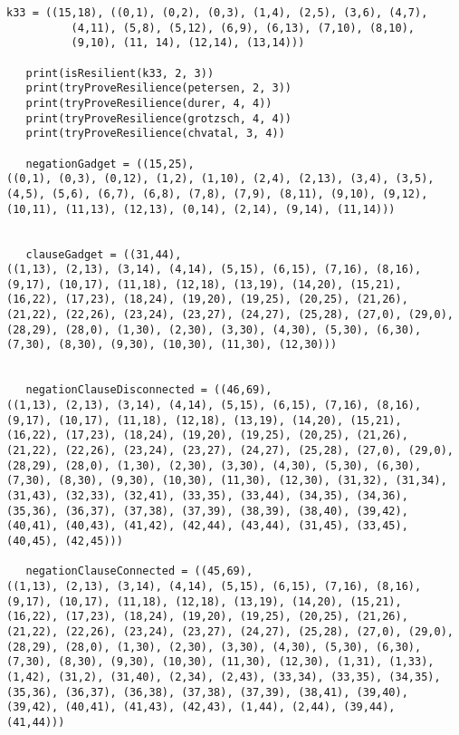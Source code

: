 \begin{lstlisting}[caption={The sourcecode for computing resilience by brute
force and heuristically-guided search.},label=listing:resilience]
   k33 = ((15,18), ((0,1), (0,2), (0,3), (1,4), (2,5), (3,6), (4,7),
          (4,11), (5,8), (5,12), (6,9), (6,13), (7,10), (8,10),
          (9,10), (11, 14), (12,14), (13,14)))

   print(isResilient(k33, 2, 3))
   print(tryProveResilience(petersen, 2, 3))
   print(tryProveResilience(durer, 4, 4))
   print(tryProveResilience(grotzsch, 4, 4))
   print(tryProveResilience(chvatal, 3, 4))

   negationGadget = ((15,25),
((0,1), (0,3), (0,12), (1,2), (1,10), (2,4), (2,13), (3,4), (3,5),
(4,5), (5,6), (6,7), (6,8), (7,8), (7,9), (8,11), (9,10), (9,12),
(10,11), (11,13), (12,13), (0,14), (2,14), (9,14), (11,14)))


   clauseGadget = ((31,44),
((1,13), (2,13), (3,14), (4,14), (5,15), (6,15), (7,16), (8,16),
(9,17), (10,17), (11,18), (12,18), (13,19), (14,20), (15,21),
(16,22), (17,23), (18,24), (19,20), (19,25), (20,25), (21,26),
(21,22), (22,26), (23,24), (23,27), (24,27), (25,28), (27,0), (29,0),
(28,29), (28,0), (1,30), (2,30), (3,30), (4,30), (5,30), (6,30),
(7,30), (8,30), (9,30), (10,30), (11,30), (12,30)))


   negationClauseDisconnected = ((46,69),
((1,13), (2,13), (3,14), (4,14), (5,15), (6,15), (7,16), (8,16),
(9,17), (10,17), (11,18), (12,18), (13,19), (14,20), (15,21),
(16,22), (17,23), (18,24), (19,20), (19,25), (20,25), (21,26),
(21,22), (22,26), (23,24), (23,27), (24,27), (25,28), (27,0), (29,0),
(28,29), (28,0), (1,30), (2,30), (3,30), (4,30), (5,30), (6,30),
(7,30), (8,30), (9,30), (10,30), (11,30), (12,30), (31,32), (31,34),
(31,43), (32,33), (32,41), (33,35), (33,44), (34,35), (34,36),
(35,36), (36,37), (37,38), (37,39), (38,39), (38,40), (39,42),
(40,41), (40,43), (41,42), (42,44), (43,44), (31,45), (33,45),
(40,45), (42,45)))

   negationClauseConnected = ((45,69), 
((1,13), (2,13), (3,14), (4,14), (5,15), (6,15), (7,16), (8,16),
(9,17), (10,17), (11,18), (12,18), (13,19), (14,20), (15,21),
(16,22), (17,23), (18,24), (19,20), (19,25), (20,25), (21,26),
(21,22), (22,26), (23,24), (23,27), (24,27), (25,28), (27,0), (29,0),
(28,29), (28,0), (1,30), (2,30), (3,30), (4,30), (5,30), (6,30),
(7,30), (8,30), (9,30), (10,30), (11,30), (12,30), (1,31), (1,33),
(1,42), (31,2), (31,40), (2,34), (2,43), (33,34), (33,35), (34,35),
(35,36), (36,37), (36,38), (37,38), (37,39), (38,41), (39,40),
(39,42), (40,41), (41,43), (42,43), (1,44), (2,44), (39,44),
(41,44)))


\end{lstlisting}
